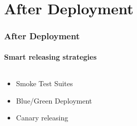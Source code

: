 \documentclass{beamer}
\begin{document}
\section{After Deployment}

\begin{frame}
	\frametitle{After Deployment}
	\framesubtitle{Smart releasing strategies}
\begin{columns}
 \begin{column}{.49\textwidth}
	\begin{itemize}
		\item Smoke Test Suites
		\item Blue/Green Deployment
		\item Canary releasing
	\end{itemize}
\end{column}
\begin{column}{.49\textwidth}
	\begin{figure}
		\begin{center}
 			\par

\end{center}
\end{figure}
\end{column}
\end{columns}
\end{frame}
\end{document}
